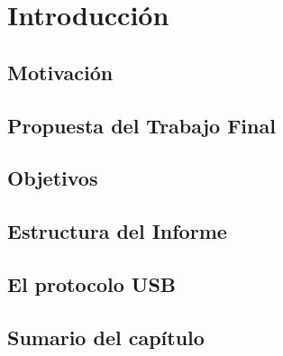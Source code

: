 \chapter{Introducción}
	\label{cap:int}
	
	\section{Motivación}
		\label{int:mot}
		
	\section{Propuesta del Trabajo Final}
		\label{int:pro}
		
	\section{Objetivos}
		\label{int:obj}
		
	\section{Estructura del Informe}
		\label{int:est}
		
	\section{El protocolo USB}
		\label{int:usb}
		
	\section{Sumario del capítulo} 
		\label{int:res}
		
		
%	
%	